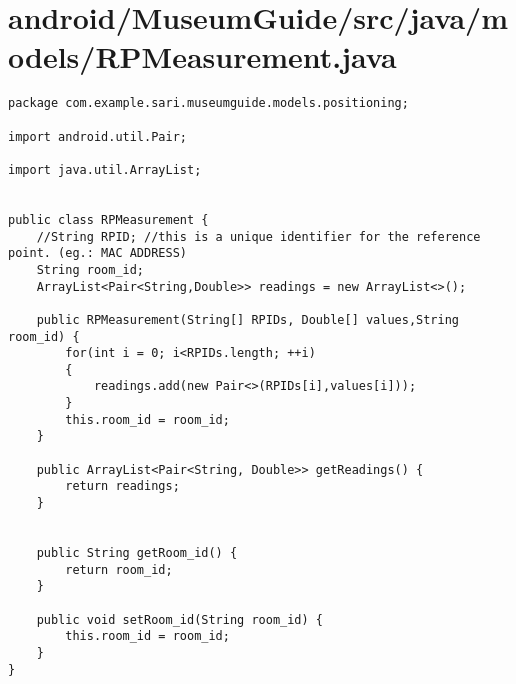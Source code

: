 \section{android/MuseumGuide/src/java/models/RPMeasurement.java}
\begin{lstlisting}package com.example.sari.museumguide.models.positioning;

import android.util.Pair;

import java.util.ArrayList;


public class RPMeasurement {
    //String RPID; //this is a unique identifier for the reference point. (eg.: MAC ADDRESS)
    String room_id;
    ArrayList<Pair<String,Double>> readings = new ArrayList<>();

    public RPMeasurement(String[] RPIDs, Double[] values,String room_id) {
        for(int i = 0; i<RPIDs.length; ++i)
        {
            readings.add(new Pair<>(RPIDs[i],values[i]));
        }
        this.room_id = room_id;
    }

    public ArrayList<Pair<String, Double>> getReadings() {
        return readings;
    }


    public String getRoom_id() {
        return room_id;
    }

    public void setRoom_id(String room_id) {
        this.room_id = room_id;
    }
}
\end{lstlisting}
\newpage
